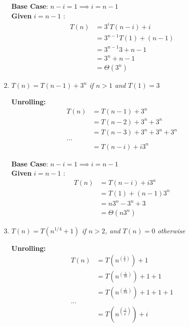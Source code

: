 \documentclass[12pt]{article} \setlength{\oddsidemargin}{0in}
\begin{document}
\begin{enumerate}
\begin{enumerate}
    \textbf{Base Case}: $n-i = 1 \implies i=n-1$ \\
    \medskip
    \textbf{Given} $i = n-1$ : \\
    \begin{align}
      T(n) &= 3^iT(n-i)+i \\
      &= 3^{n-1}T(1)+(n-1) \\
      &= 3^{n-1}3+n-1 \\
      &= 3^n + n - 1 \\
      &= \Theta(3^n)
    \end{align}
  
  \newpage

  \item \textit{$T(n)=T(n-1)+3^n$ if $n>1$ and $T(1)=3$}

    \textbf{Unrolling:} \\

    \begin{align}
      T(n) &= T(n-1) + 3^n \\
      &= T(n-2) + 3^n + 3^n \\
      &= T(n-3) + 3^n + 3^n + 3^n \\
      ... \\
      &= T(n-i) + i3^n
    \end{align}

    \textbf{Base Case}: $n-i = 1 \implies i=n-1$ \\
    \medskip
    \textbf{Given} $i = n-1$ : \\
    \begin{align}
      T(n) &= T(n-i) + i3^n \\
      &= T(1) + (n-1)3^n \\
      &= n3^n-3^n+3 \\
      &= \Theta(n3^n)
    \end{align}


  \newpage 

  \item \textit{$T(n)=T(n^{1/4}+1)$ if $n>2$, and $T(n)=0$ otherwise}

    \textbf{Unrolling:} \\

    \begin{align}
      T(n) &= T(n^{(\frac{1}{4})}) + 1 \\
      &= T(n^{(\frac{1}{16})}) + 1 + 1 \\
      &= T(n^{(\frac{1}{64})}) + 1 + 1 + 1 \\
      ... \\
      &= T(n^{(\frac{1}{4^i})}) + i
    \end{align}


\end{enumerate}
\end{enumerate}
\end{document}
